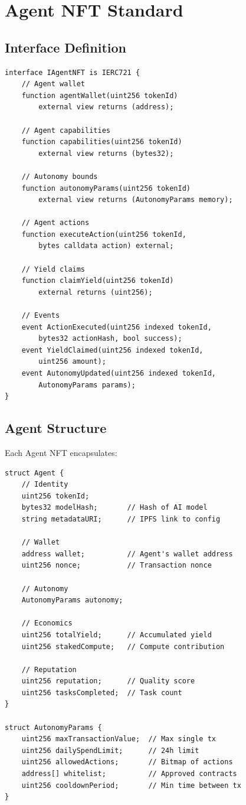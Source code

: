 \section{Agent NFT Standard}

\label{sec:standard}

\subsection{Interface Definition}

\begin{lstlisting}[language=Solidity,caption=IAgentNFT Interface]
interface IAgentNFT is IERC721 {
    // Agent wallet
    function agentWallet(uint256 tokenId)
        external view returns (address);

    // Agent capabilities
    function capabilities(uint256 tokenId)
        external view returns (bytes32);

    // Autonomy bounds
    function autonomyParams(uint256 tokenId)
        external view returns (AutonomyParams memory);

    // Agent actions
    function executeAction(uint256 tokenId,
        bytes calldata action) external;

    // Yield claims
    function claimYield(uint256 tokenId)
        external returns (uint256);

    // Events
    event ActionExecuted(uint256 indexed tokenId,
        bytes32 actionHash, bool success);
    event YieldClaimed(uint256 indexed tokenId,
        uint256 amount);
    event AutonomyUpdated(uint256 indexed tokenId,
        AutonomyParams params);
}
\end{lstlisting}

\subsection{Agent Structure}

Each Agent NFT encapsulates:

\begin{lstlisting}[language=Solidity,caption=Agent Data Structure]
struct Agent {
    // Identity
    uint256 tokenId;
    bytes32 modelHash;       // Hash of AI model
    string metadataURI;      // IPFS link to config

    // Wallet
    address wallet;          // Agent's wallet address
    uint256 nonce;           // Transaction nonce

    // Autonomy
    AutonomyParams autonomy;

    // Economics
    uint256 totalYield;      // Accumulated yield
    uint256 stakedCompute;   // Compute contribution

    // Reputation
    uint256 reputation;      // Quality score
    uint256 tasksCompleted;  // Task count
}

struct AutonomyParams {
    uint256 maxTransactionValue;  // Max single tx
    uint256 dailySpendLimit;      // 24h limit
    uint256 allowedActions;       // Bitmap of actions
    address[] whitelist;          // Approved contracts
    uint256 cooldownPeriod;       // Min time between tx
}
\end{lstlisting}

